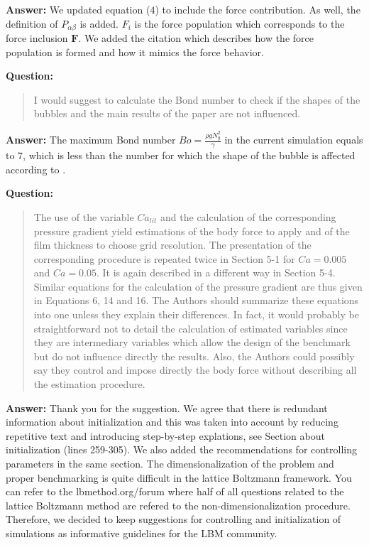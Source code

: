 \documentclass{article}
\begin{document}
\textbf{Answer:} We updated equation (4) to include the force contribution. As well, the definition
of $P_{\alpha\beta}$ is added. $F_i$ is the force population which corresponds to the force
inclusion $\bm{F}$. We added the citation which describes how the force population is formed and
how it
mimics the force behavior.

\textbf{Question:}
\begin{quotation}
I would suggest to calculate the Bond number to check if the shapes of the bubbles and the main
results of the paper are not inﬂuenced.
\end{quotation}

\textbf{Answer:} 
The maximum Bond number $Bo=\frac{\rho g N_y^2}{\gamma}$ in the
current simulation equals to $7$, which is less than the number for which the shape of the bubble is
affected according to \cite{zheng-large-ratio}.  

\textbf{Question:}
\begin{quotation}
The use of the variable $Ca_{lit}$ and the calculation of the corresponding pressure gradient yield
estimations of the body force to apply and of the film thickness to choose grid resolution. The
presentation
of the corresponding procedure is repeated twice in Section 5-1 for $Ca=0.005$ and $Ca=0.05$. It is
again described in a diﬀerent way in Section 5-4. Similar equations for the calculation of the
pressure
gradient are thus given in Equations 6, 14 and 16. The Authors should summarize these equations
into one unless they explain their differences. In fact, it would probably be straightforward not to
detail the calculation of estimated variables since they are intermediary variables which allow the
design of the benchmark but do not inﬂuence directly the results. Also, the Authors could possibly
say they control and impose directly the body force without describing all the estimation procedure.
\end{quotation}

\textbf{Answer:} Thank you for the suggestion. We agree that there is redundant information
about initialization and this was taken into account by reducing repetitive text and
introducing step-by-step explations, see Section about initialization (lines 259-305). We also added
the
recommendations for controlling parameters in the same section.  The
dimensionalization of the problem and proper benchmarking is quite difficult in the lattice
Boltzmann framework. You can refer to the lbmethod.org/forum where half of all questions related to
the lattice Boltzmann method are refered to the non-dimensionalization procedure. Therefore, we
decided to
keep suggestions for controlling and initialization of simulations as informative guidelines for the
LBM community.
\end{document}
